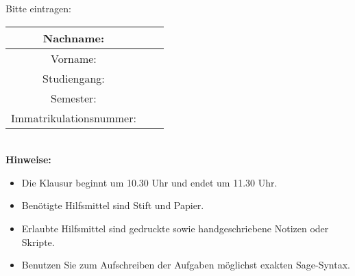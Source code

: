\bigskip\bigskip\bigskip
Bitte eintragen:\\
\begin{center}
\begin{tabular}{|Sl|p{8cm}|}
\hline
Nachname: & \\
\hline
Vorname: & \\
\hline
Studiengang: & \\
\hline 
Semester: & \\
\hline 
Immatrikulationsnummer: & \\
\hline
\end{tabular}\\[1cm]
\textbf{Hinweise:}
\begin{itemize}
\item Die Klausur beginnt um 10.30 Uhr und endet um 11.30 Uhr.
\item Benötigte Hilfsmittel sind Stift und Papier.
\item Erlaubte Hilfsmittel sind gedruckte sowie handgeschriebene Notizen oder Skripte. 
\item Benutzen Sie zum Aufschreiben der Aufgaben möglichst exakten Sage-Syntax.
\end{itemize}
\end{center}

\newpage
\normalsize
